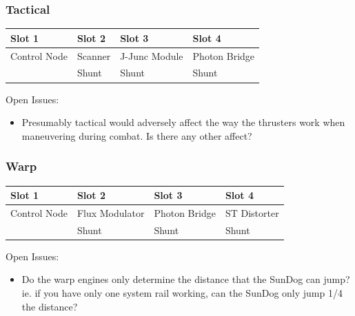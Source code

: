 
\subsubsection{Tactical}

\begin{tabular}{ | p{2.5cm} | p{2.5cm} | p{2.5cm} | p{2.5cm} | }
\hline
Slot 1 & Slot 2 & Slot 3 & Slot 4 \\ \hline
Control Node & Scanner & J-Junc Module & Photon Bridge \\
& Shunt & Shunt & Shunt \\
\hline
\end{tabular}

Open Issues:
\begin{itemize}
\item Presumably tactical would adversely affect the way the thrusters
work when maneuvering during combat.  Is there any other affect?
\end{itemize}

\subsubsection{Warp}

\begin{tabular}{ | p{2.5cm} | p{2.5cm} | p{2.5cm} | p{2.5cm} | }
\hline
Slot 1 & Slot 2 & Slot 3 & Slot 4 \\ \hline
Control Node & Flux Modulator & Photon Bridge & ST Distorter \\
& Shunt & Shunt & Shunt \\
\hline
\end{tabular}

Open Issues:
\begin{itemize}
\item Do the warp engines only determine the distance that the SunDog
can jump?  ie. if you have only one system rail working, can the SunDog
only jump 1/4 the distance? 
\end{itemize}

